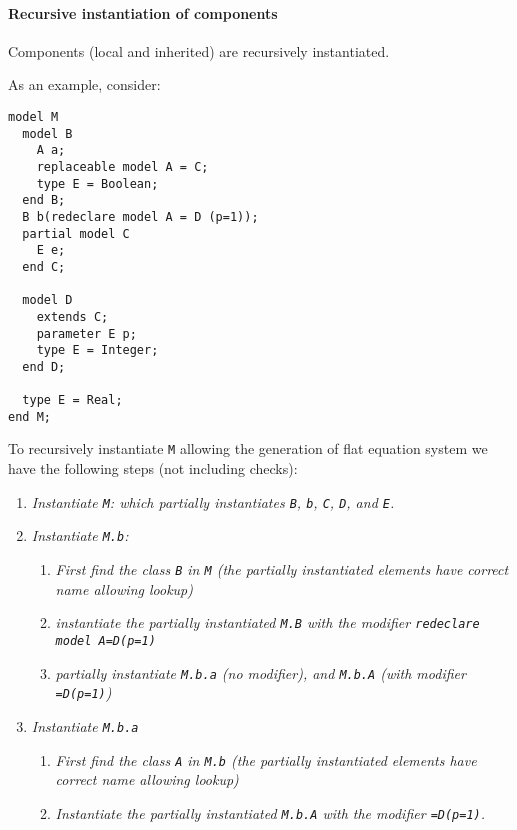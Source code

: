 \paragraph*{Recursive instantiation of components}

Components (local and inherited) are recursively instantiated.

\begin{example}
As an example, consider:
\begin{lstlisting}[language=modelica]
model M
  model B
    A a;
    replaceable model A = C;
    type E = Boolean;
  end B;
  B b(redeclare model A = D (p=1));
  partial model C
    E e;
  end C;

  model D
    extends C;
    parameter E p;
    type E = Integer;
  end D;

  type E = Real;
end M;
\end{lstlisting}

To recursively instantiate \lstinline!M! allowing the generation of flat
equation system we have the following steps (not including checks):
\begin{enumerate}
\item
  \emph{Instantiate \lstinline!M!: which partially instantiates \lstinline!B!, \lstinline!b!, \lstinline!C!, \lstinline!D!, and \lstinline!E!.}
\item
  \emph{Instantiate \lstinline!M.b!:}

  \begin{enumerate}
  \item
    \emph{First find the class \lstinline!B! in \lstinline!M! (the partially instantiated
    elements have correct name allowing lookup)}
  \item
    \emph{instantiate the partially instantiated \lstinline!M.B! with the modifier
    \lstinline!redeclare model A=D(p=1)!}
  \item
    \emph{partially instantiate \lstinline!M.b.a! (no modifier), and \lstinline!M.b.A! (with
    modifier \lstinline!=D(p=1)!)}
  \end{enumerate}
\item
  \emph{Instantiate \lstinline!M.b.a!}

  \begin{enumerate}
  \item
    \emph{First find the class \lstinline!A! in \lstinline!M.b! (the partially instantiated
    elements have correct name allowing lookup)}
  \item
    \emph{Instantiate the partially instantiated \lstinline!M.b.A! with the modifier
    \lstinline!=D(p=1)!.}


\end{enumerate}
\end{enumerate}
\end{example}

